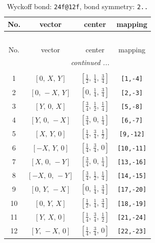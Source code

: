 \documentclass[fleqn,8pt]{jsarticle}
\begin{document}
\begin{longtable}{cccc}
\caption{Wyckoff bond: {\tt 24f@12f}, bond symmetry: {\tt 2..}}
 \\
 \hline \hline
No. & vector & center & mapping \\ \hline \endfirsthead

\multicolumn{3}{l}{\tablename\ \thetable{}} \\
 \hline \hline
No. & vector & center & mapping \\ \hline \endhead

 \hline \hline
\multicolumn{3}{r}{\footnotesize\it continued ...} \\ \endfoot

 \hline \hline
\multicolumn{3}{r}{} \\ \endlastfoot

1 & $\left[ 0,\, X,\, Y \right]$ & $\left[ \frac{1}{2},\, \frac{1}{4},\, \frac{3}{4} \right]$ & {\tt [1,-4]} \\ \hline
2 & $\left[ 0,\, - X,\, Y \right]$ & $\left[ 0,\, \frac{1}{4},\, \frac{3}{4} \right]$ & {\tt [2,-3]} \\ \hline
3 & $\left[ Y,\, 0,\, X \right]$ & $\left[ \frac{3}{4},\, \frac{1}{2},\, \frac{1}{4} \right]$ & {\tt [5,-8]} \\ \hline
4 & $\left[ Y,\, 0,\, - X \right]$ & $\left[ \frac{3}{4},\, 0,\, \frac{1}{4} \right]$ & {\tt [6,-7]} \\ \hline
5 & $\left[ X,\, Y,\, 0 \right]$ & $\left[ \frac{1}{4},\, \frac{3}{4},\, \frac{1}{2} \right]$ & {\tt [9,-12]} \\ \hline
6 & $\left[ - X,\, Y,\, 0 \right]$ & $\left[ \frac{1}{4},\, \frac{3}{4},\, 0 \right]$ & {\tt [10,-11]} \\ \hline
7 & $\left[ X,\, 0,\, - Y \right]$ & $\left[ \frac{3}{4},\, 0,\, \frac{1}{4} \right]$ & {\tt [13,-16]} \\ \hline
8 & $\left[ - X,\, 0,\, - Y \right]$ & $\left[ \frac{3}{4},\, \frac{1}{2},\, \frac{1}{4} \right]$ & {\tt [14,-15]} \\ \hline
9 & $\left[ 0,\, Y,\, - X \right]$ & $\left[ 0,\, \frac{1}{4},\, \frac{3}{4} \right]$ & {\tt [17,-20]} \\ \hline
10 & $\left[ 0,\, Y,\, X \right]$ & $\left[ \frac{1}{2},\, \frac{1}{4},\, \frac{3}{4} \right]$ & {\tt [18,-19]} \\ \hline
11 & $\left[ Y,\, X,\, 0 \right]$ & $\left[ \frac{1}{4},\, \frac{3}{4},\, \frac{1}{2} \right]$ & {\tt [21,-24]} \\ \hline
12 & $\left[ Y,\, - X,\, 0 \right]$ & $\left[ \frac{1}{4},\, \frac{3}{4},\, 0 \right]$ & {\tt [22,-23]} \\ \hline

\end{longtable}
\end{document}
